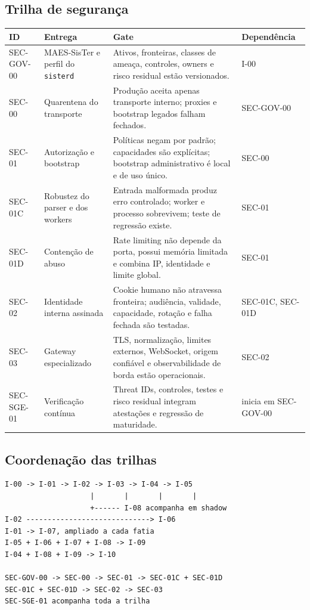 \documentclass[11pt,a4paper,oneside]{article}
\begin{document}
\subsection{Trilha de segurança}
\begin{longtable}{P{1.8cm}P{3.2cm}P{5.5cm}P{2.9cm}}
\toprule
\textbf{ID} & \textbf{Entrega} & \textbf{Gate} & \textbf{Dependência} \\
\midrule
\endhead
SEC-GOV-00 & MAES-SisTer e perfil do \texttt{sisterd} & Ativos, fronteiras, classes de ameaça, controles, owners e risco residual estão versionados. & I-00 \\
SEC-00 & Quarentena do transporte & Produção aceita apenas transporte interno; proxies e bootstrap legados falham fechados. & SEC-GOV-00 \\
SEC-01 & Autorização e bootstrap & Políticas negam por padrão; capacidades são explícitas; bootstrap administrativo é local e de uso único. & SEC-00 \\
SEC-01C & Robustez do parser e dos workers & Entrada malformada produz erro controlado; worker e processo sobrevivem; teste de regressão existe. & SEC-01 \\
SEC-01D & Contenção de abuso & Rate limiting não depende da porta, possui memória limitada e combina IP, identidade e limite global. & SEC-01 \\
SEC-02 & Identidade interna assinada & Cookie humano não atravessa fronteira; audiência, validade, capacidade, rotação e falha fechada são testadas. & SEC-01C, SEC-01D \\
SEC-03 & Gateway especializado & TLS, normalização, limites externos, WebSocket, origem confiável e observabilidade de borda estão operacionais. & SEC-02 \\
SEC-SGE-01 & Verificação contínua & Threat IDs, controles, testes e risco residual integram atestações e regressão de maturidade. & inicia em SEC-GOV-00 \\
\bottomrule
\end{longtable}

\subsection{Coordenação das trilhas}
\begin{lstlisting}
I-00 -> I-01 -> I-02 -> I-03 -> I-04 -> I-05
                    |       |       |       |
                    +------ I-08 acompanha em shadow
I-02 -----------------------------> I-06
I-01 -> I-07, ampliado a cada fatia
I-05 + I-06 + I-07 + I-08 -> I-09
I-04 + I-08 + I-09 -> I-10

SEC-GOV-00 -> SEC-00 -> SEC-01 -> SEC-01C + SEC-01D
SEC-01C + SEC-01D -> SEC-02 -> SEC-03
SEC-SGE-01 acompanha toda a trilha
\end{lstlisting}
\end{document}
